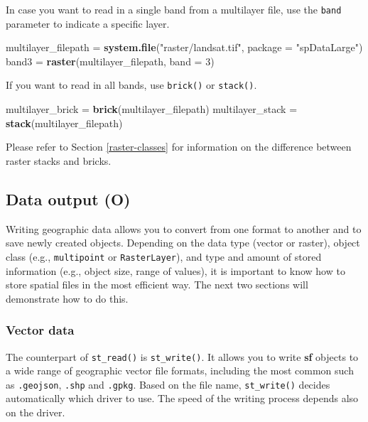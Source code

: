 \documentclass[]{krantz}
\newenvironment{Shaded}{\begin{snugshade}}{\end{snugshade}}
\newcommand{\DataTypeTok}[1]{\textcolor[rgb]{0.27,0.27,0.27}{#1}}
\newcommand{\DecValTok}[1]{\textcolor[rgb]{0.06,0.06,0.06}{#1}}
\newcommand{\KeywordTok}[1]{\textcolor[rgb]{0.27,0.27,0.27}{\textbf{#1}}}
\newcommand{\NormalTok}[1]{#1}
\newcommand{\StringTok}[1]{\textcolor[rgb]{0.5,0.5,0.5}{#1}}
\begin{document}
In case you want to read in a single band from a multilayer file, use the \texttt{band} parameter to indicate a specific layer.

\begin{Shaded}
\begin{Highlighting}[]
\NormalTok{multilayer_filepath =}\StringTok{ }\KeywordTok{system.file}\NormalTok{(}\StringTok{"raster/landsat.tif"}\NormalTok{, }\DataTypeTok{package =} \StringTok{"spDataLarge"}\NormalTok{)}
\NormalTok{band3 =}\StringTok{ }\KeywordTok{raster}\NormalTok{(multilayer_filepath, }\DataTypeTok{band =} \DecValTok{3}\NormalTok{)}
\end{Highlighting}
\end{Shaded}

If you want to read in all bands, use \texttt{brick()} or \texttt{stack()}.

\begin{Shaded}
\begin{Highlighting}[]
\NormalTok{multilayer_brick =}\StringTok{ }\KeywordTok{brick}\NormalTok{(multilayer_filepath)}
\NormalTok{multilayer_stack =}\StringTok{ }\KeywordTok{stack}\NormalTok{(multilayer_filepath)}
\end{Highlighting}
\end{Shaded}

Please refer to Section \ref{raster-classes} for information on the difference between raster stacks and bricks.

\hypertarget{data-output}{%
\subsection{Data output (O)}\label{data-output}}

Writing geographic data allows you to convert from one format to another and to save newly created objects.
Depending on the data type (vector or raster), object class (e.g., \texttt{multipoint} or \texttt{RasterLayer}), and type and amount of stored information (e.g., object size, range of values), it is important to know how to store spatial files in the most efficient way.
The next two sections will demonstrate how to do this.

\hypertarget{vector-data-2}{%
\subsubsection{Vector data}\label{vector-data-2}}

The counterpart of \texttt{st\_read()} is \texttt{st\_write()}.
It allows you to write \textbf{sf} objects to a wide range of geographic vector file formats, including the most common such as \texttt{.geojson}, \texttt{.shp} and \texttt{.gpkg}.
Based on the file name, \texttt{st\_write()} decides automatically which driver to use.
The speed of the writing process depends also on the driver.
\end{document}
